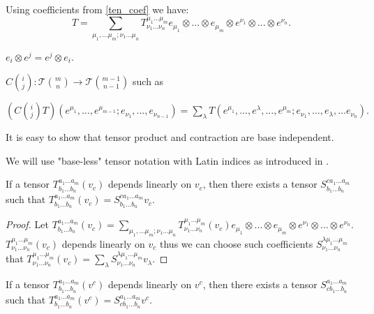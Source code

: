 \documentclass[main.tex]{subfiles}
\begin{document}
Using coefficients from \ref{ten_coef} we have:
\begin{equation}
\boxed{T = \sum\limits_{\mu_1,\dots\mu_m;\nu_1\dots\mu_n} T^{\mu_1\dots\mu_m}_{\nu_1\dots\nu_n} e_{\mu_1} \otimes \dots \otimes e_{\mu_m} \otimes e^{\nu_1} \otimes \dots \otimes e^{\nu_n}.}
\end{equation}

\begin{remark}
$e_i \otimes e^j = e^j \otimes e_i.$
\end{remark}

\begin{definition}
$C\binom{i}{j}:\mathcal{T}\binom{m}{n}\to\mathcal{T}\binom{m - 1}{n - 1}$ such as

$(C\binom{i}{j}T)(e^{\mu_1}, \dots, e^{\mu_{m-1}}; e_{\nu_1}, \dots, e_{\nu_{n-1}}) = \sum_\lambda 
T(e^{\mu_1}, \dots, e^\lambda, \dots, e^{\mu_m}; e_{\nu_1}, \dots, e_\lambda, \dots e_{\nu_n}).$
\end{definition}

\noindent
It is easy to show that tensor product and contraction are base independent.

\noindent
We will use "base-less" tensor notation with Latin indices as introduced in \cite{wald1984}.

\begin{lemma}
If a tensor $T^{a_1\dots a_m}_{b_1\dots b_n}(v_c)$ depends linearly on $v_c$, then there exists a tensor 
$S^{c a_1\dots a_m}_{b_1\dots b_n}$ such that $T^{a_1\dots a_m}_{b_1\dots b_n}(v_c) = S^{c a_1\dots a_m}_{b_1\dots b_n} v_c.$
\end{lemma}

\begin{proof}
Let $T^{a_1\dots a_m}_{b_1\dots b_n}(v_c) = \sum\limits_{\mu_1,\dots\mu_m;\nu_1\dots\mu_n} T^{\mu_1\dots\mu_m}_{\nu_1\dots\nu_n}(v_c) e_{\mu_1} \otimes \dots \otimes e_{\mu_m} \otimes e^{\nu_1} \otimes \dots \otimes e^{\nu_n}$. $T^{\mu_1\dots\mu_m}_{\nu_1\dots\nu_n}(v_c)$ depends linearly on $v_c$ thus we can choose such coefficients 
$S^{\lambda \mu_1\dots\mu_m}_{\nu_1\dots\nu_n}$ 
that $T^{\mu_1\dots\mu_m}_{\nu_1\dots\nu_n}(v_c) = \sum_\lambda S^{\lambda \mu_1\dots\mu_m}_{\nu_1\dots\nu_n} v_\lambda$.
\end{proof}

\begin{corollary}
If a tensor $T^{a_1\dots a_m}_{b_1\dots b_n}(v^c)$ depends linearly on $v^c$, then there exists a tensor 
$S^{a_1\dots a_m}_{c b_1\dots b_n}$ such that $T^{a_1\dots a_m}_{b_1\dots b_n}(v^c) = S^{a_1\dots a_m}_{c b_1\dots b_n} v^c.$
\end{corollary} 
\end{document}
